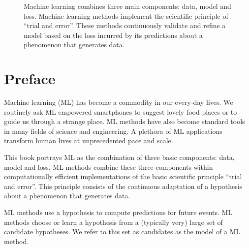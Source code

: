 \documentclass[12pt]{report}
\begin{document}
\begin{center}
\begin{figure}[htbp]
	\vspace*{-9mm}
	\caption{
		Machine learning combines three main components: data, model and loss. Machine learning 
		methods implement the scientific principle of ``trial and error''. These methods continuously validate and 
		refine a model based on the loss incurred by its predictions about a phenomenon that generates data.}
	\label{fig_AlexMLBP}
\end{figure}
\end{center}



\newpage
\chapter*{Preface}

Machine learning (ML) has become a commodity in our every-day lives. 
We routinely ask ML empowered smartphones to suggest lovely food 
places or to guide us through a strange place. ML methods have also 
become standard tools in many fields of science and engineering. A 
plethora of ML applications transform human lives at unprecedented 
pace and scale. 

This book portrays ML as the combination of three basic components: 
data, model and loss. ML methods combine these three components 
within computationally efficient implementations of the basic scientific 
principle ``trial and error''. This principle consists of the continuous 
adaptation of a hypothesis about a phenomenon that generates data. 

ML methods use a hypothesis to compute predictions for future events. 
ML methods choose or learn a hypothesis from a (typically very) large set 
of candidate hypotheses. We refer to this set as candidates as the model 
of a ML method. 
\end{document}
